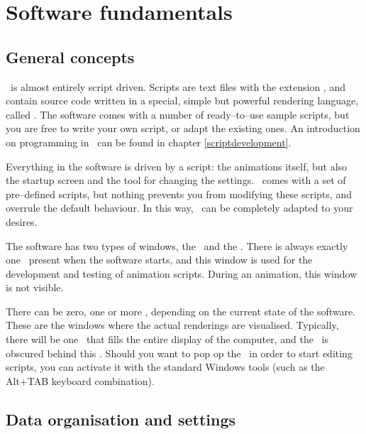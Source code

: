 
\chapter{Software fundamentals}







\section{General concepts}

\softwarename\ is almost entirely script driven. Scripts are text files with the extension , and contain source code written in a special, simple but powerful rendering language, called \scriptlang. The software comes with a number of ready--to--use sample scripts, but you are free to write your own script, or adapt the existing ones. An introduction on programming in \scriptlang\ can be found in chapter \ref{scriptdevelopment}.

Everything in the software is driven by a script: the animations itself, but also the startup screen and the tool for changing the settings. \softwarename\ comes with a set of pre--defined scripts, but nothing prevents you from modifying these scripts, and overrule the default behaviour. In this way, \softwarename\ can be completely adapted to your desires.

The software has two types of windows, the \sourcewin\ and the \renderwin. There is always exactly one \sourcewin\ present when the software starts, and this window is used for the development and testing of animation scripts. During an animation, this window is not visible.

There can be zero, one or more \renderwins, depending on the current state of the software. These are the windows where the actual renderings are visualised. Typically, there will be one \renderwin\ that fills the entire display of the computer, and the \sourcewin\ is obscured behind this \renderwin. Should you want to pop op the \sourcewin\ in order to start editing scripts, you can activate it with the standard Windows tools (such as the Alt+TAB keyboard combination).

\section{Data organisation and settings}

